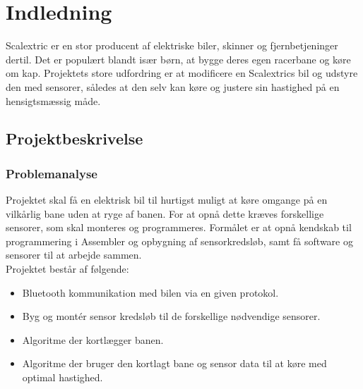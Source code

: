 \newpage

\tableofcontents



\newpage
\section{Indledning}
Scalextric er en stor producent af elektriske biler, skinner og fjernbetjeninger dertil. Det er populært blandt især børn, at bygge deres egen racerbane og køre om kap. Projektets store udfordring er at modificere en Scalextrics bil og udstyre den med sensorer, således at den selv kan køre og justere sin hastighed på en hensigtsmæssig måde.

\subsection{Projektbeskrivelse}
\subsubsection{Problemanalyse}
\label{problemanalyse}
Projektet skal få en elektrisk bil til hurtigst muligt at køre omgange på en vilkårlig bane uden at ryge af banen. For at opnå dette kræves forskellige sensorer, som skal monteres og programmeres. Formålet er at opnå kendskab til programmering i Assembler og opbygning af sensorkredsløb, samt få software og sensorer til at arbejde sammen.  \\
Projektet består af følgende: \\

\begin{itemize}
\item Bluetooth kommunikation med bilen via en given protokol.
\item Byg og montér sensor kredsløb til de forskellige nødvendige sensorer.
\item Algoritme der kortlægger banen.
\item Algoritme der bruger den kortlagt bane og sensor data til at køre med optimal hastighed.
\end{itemize}


